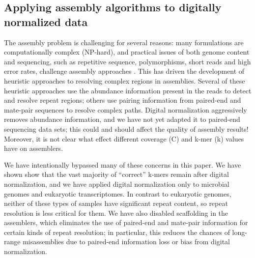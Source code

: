 \documentclass{pnastwo}
\begin{document}
\begin{article}

\subsection{Applying assembly algorithms to digitally normalized data}


The assembly problem is challenging for several reasons: many
formulations are computationally complex (NP-hard), and practical issues of both genome content
and sequencing, such as repetitive sequence, polymorphisms, short
reads and high error rates, challenge assembly approaches
\cite{pubmed19580519}.  This has driven the development of heuristic
approaches to resolving complex regions in assemblies.  Several of
these heuristic approaches use the abundance information present in
the reads to detect and resolve repeat regions; others use pairing
information from paired-end and mate-pair sequences to resolve complex
paths.  Digital normalization aggressively removes abundance
information, and we have not yet adapted it to paired-end sequencing
data sets; this could and should affect the quality of assembly
results! Moreover, it is not clear what effect different coverage (C)
and k-mer (k) values have on assemblers.

We have intentionally bypassed many of these concerns in this
paper. We have shown show that the vast majority of ``correct'' k-mers
remain after digital normalization, and we have applied digital
normalization only to microbial genomes and eukaryotic transcriptomes.
In contrast to eukaryotic genomes, 
neither of these types of samples have significant repeat
content, so repeat resolution is less
critical for them.  We have also disabled
scaffolding in the assemblers, which eliminates the use of paired-end
and mate-pair information for certain kinds of repeat resolution; in
particular, this reduces the chances of long-range misassemblies due
to paired-end information loss or bias from digital normalization.


\end{article}
\end{document}
